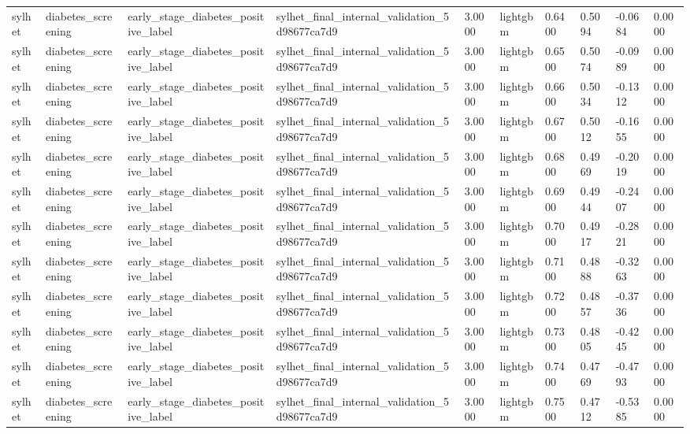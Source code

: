 \begin{tabular}{llllllllll}
sylhet & diabetes\_screening & early\_stage\_diabetes\_positive\_label & sylhet\_final\_internal\_validation\_5d98677ca7d9 & 3.0000 & lightgbm & 0.6400 & 0.5094 & -0.0684 & 0.0000 \\
sylhet & diabetes\_screening & early\_stage\_diabetes\_positive\_label & sylhet\_final\_internal\_validation\_5d98677ca7d9 & 3.0000 & lightgbm & 0.6500 & 0.5074 & -0.0989 & 0.0000 \\
sylhet & diabetes\_screening & early\_stage\_diabetes\_positive\_label & sylhet\_final\_internal\_validation\_5d98677ca7d9 & 3.0000 & lightgbm & 0.6600 & 0.5034 & -0.1312 & 0.0000 \\
sylhet & diabetes\_screening & early\_stage\_diabetes\_positive\_label & sylhet\_final\_internal\_validation\_5d98677ca7d9 & 3.0000 & lightgbm & 0.6700 & 0.5012 & -0.1655 & 0.0000 \\
sylhet & diabetes\_screening & early\_stage\_diabetes\_positive\_label & sylhet\_final\_internal\_validation\_5d98677ca7d9 & 3.0000 & lightgbm & 0.6800 & 0.4969 & -0.2019 & 0.0000 \\
sylhet & diabetes\_screening & early\_stage\_diabetes\_positive\_label & sylhet\_final\_internal\_validation\_5d98677ca7d9 & 3.0000 & lightgbm & 0.6900 & 0.4944 & -0.2407 & 0.0000 \\
sylhet & diabetes\_screening & early\_stage\_diabetes\_positive\_label & sylhet\_final\_internal\_validation\_5d98677ca7d9 & 3.0000 & lightgbm & 0.7000 & 0.4917 & -0.2821 & 0.0000 \\
sylhet & diabetes\_screening & early\_stage\_diabetes\_positive\_label & sylhet\_final\_internal\_validation\_5d98677ca7d9 & 3.0000 & lightgbm & 0.7100 & 0.4888 & -0.3263 & 0.0000 \\
sylhet & diabetes\_screening & early\_stage\_diabetes\_positive\_label & sylhet\_final\_internal\_validation\_5d98677ca7d9 & 3.0000 & lightgbm & 0.7200 & 0.4857 & -0.3736 & 0.0000 \\
sylhet & diabetes\_screening & early\_stage\_diabetes\_positive\_label & sylhet\_final\_internal\_validation\_5d98677ca7d9 & 3.0000 & lightgbm & 0.7300 & 0.4805 & -0.4245 & 0.0000 \\
sylhet & diabetes\_screening & early\_stage\_diabetes\_positive\_label & sylhet\_final\_internal\_validation\_5d98677ca7d9 & 3.0000 & lightgbm & 0.7400 & 0.4769 & -0.4793 & 0.0000 \\
sylhet & diabetes\_screening & early\_stage\_diabetes\_positive\_label & sylhet\_final\_internal\_validation\_5d98677ca7d9 & 3.0000 & lightgbm & 0.7500 & 0.4712 & -0.5385 & 0.0000 \\

\end{tabular}
